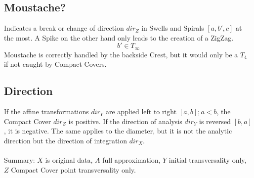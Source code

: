 \documentclass{report}
\begin{document}
\subsection{Moustache?}
Indicates a break or change of direction $dir_{Z}$ in Swells and Spirals $[a,b',c]$ at the most. A Spike on the other hand only leads to the creation of a ZigZag.
\begin{equation}
b' \in T_{\infty}
\end{equation}
Moustache is correctly handled by the backside Crest, but it would only be a $T_{4}$ if not caught by Compact Covers.

\subsection*{Direction}
If the affine transformations $dir_{Y}$ are applied left to right $[a,b];a<b$, the Compact Cover $dir_{Z}$ is positive. If the direction of analysis $dir_{Y}$ is reversed $[b,a]$, it is negative. The same applies to the diameter, but it is not the analytic direction but the direction of integration $dir_{X}$.\\\\
Summary: $X$ is original data, $A$ full approximation, $Y$ initial transversality only, $Z$ Compact Cover point transversality only.

\iffalse
\printbibliography
\fi
{}

\end{document}
